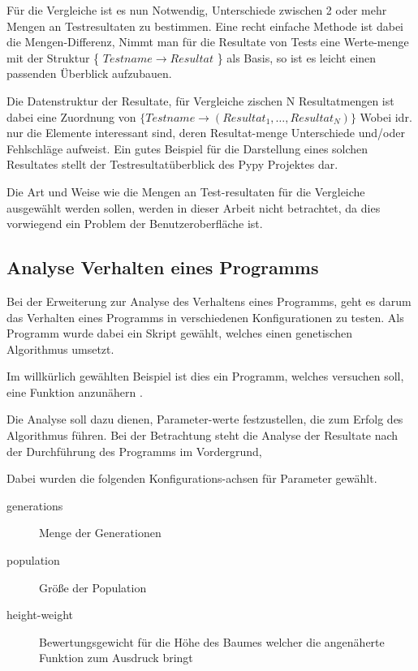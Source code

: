 Für die Vergleiche ist es nun Notwendig,
Unterschiede zwischen 2 oder mehr Mengen an Testresultaten zu bestimmen.
Eine recht einfache Methode ist dabei die Mengen-Differenz,
Nimmt man für die Resultate von Tests eine Werte-menge mit der Struktur \{ $Testname \rightarrow Resultat$ \} als Basis,
so ist es leicht einen passenden Überblick aufzubauen.

Die Datenstruktur der Resultate, für Vergleiche zischen N Resultatmengen
ist dabei eine Zuordnung von
$\{ Testname \rightarrow ( Resultat_{1},\ldots,Resultat_{N})\}$
Wobei idr. nur die Elemente interessant sind,
deren Resultat-menge Unterschiede und/oder Fehlschläge aufweist.
Ein gutes Beispiel für die Darstellung eines solchen Resultates
stellt der Testresultatüberblick des Pypy Projektes \cite{pypy:overview} dar.

Die Art und Weise wie die Mengen an Test-resultaten für die Vergleiche ausgewählt werden sollen, werden in dieser Arbeit nicht betrachtet,
da dies vorwiegend ein Problem der Benutzeroberfläche ist.

\subsection{Analyse Verhalten eines Programms}

Bei der Erweiterung zur Analyse des Verhaltens eines Programms,
geht es darum das Verhalten eines Programms
in verschiedenen Konfigurationen zu testen.
Als Programm wurde dabei ein Skript gewählt,
welches einen genetischen Algorithmus umsetzt.

Im willkürlich gewählten Beispiel ist dies ein Programm,
welches versuchen soll, eine Funktion anzunähern \cite{gen:prog}.

Die Analyse soll dazu dienen, Parameter-werte festzustellen,
die zum Erfolg des Algorithmus führen.
Bei der Betrachtung steht die Analyse der Resultate nach der Durchführung des Programms im Vordergrund,

Dabei wurden die folgenden Konfigurations-achsen für Parameter gewählt.

\begin{description}
    \item[generations] Menge der Generationen
    \item[population] Größe der Population
    \item[height-weight] Bewertungsgewicht für die Höhe des Baumes welcher die angenäherte Funktion zum Ausdruck bringt
\end{description}

